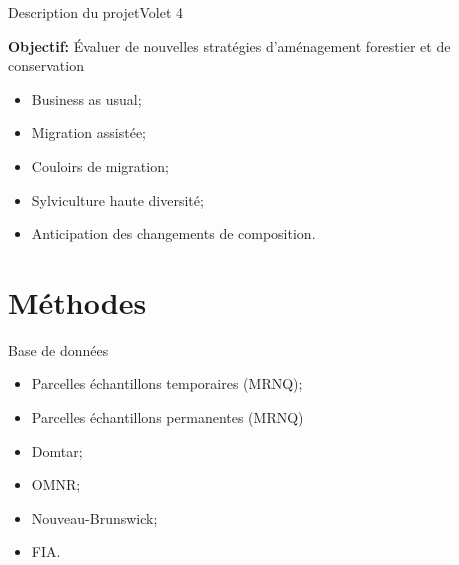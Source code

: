 \documentclass{eecslides}
\begin{document}
	\begin{frame}{Description du projet}{Volet 4}

	\textbf{Objectif:} Évaluer de nouvelles stratégies d'aménagement forestier et de conservation

		\begin{itemize}
			\item Business as usual;
			\item Migration assistée;
			\item Couloirs de migration;
			\item Sylviculture haute diversité;
			\item Anticipation des changements de composition.	
		\end{itemize}
	\end{frame}

\section{Méthodes}
	\begin{frame}{Base de données}
		\begin{itemize}
			\item Parcelles échantillons temporaires (MRNQ);
			\item Parcelles échantillons permanentes (MRNQ)
			\item Domtar;
			\item OMNR;
			\item Nouveau-Brunswick;
			\item FIA.
		\end{itemize}
	\end{frame}

\end{document}
